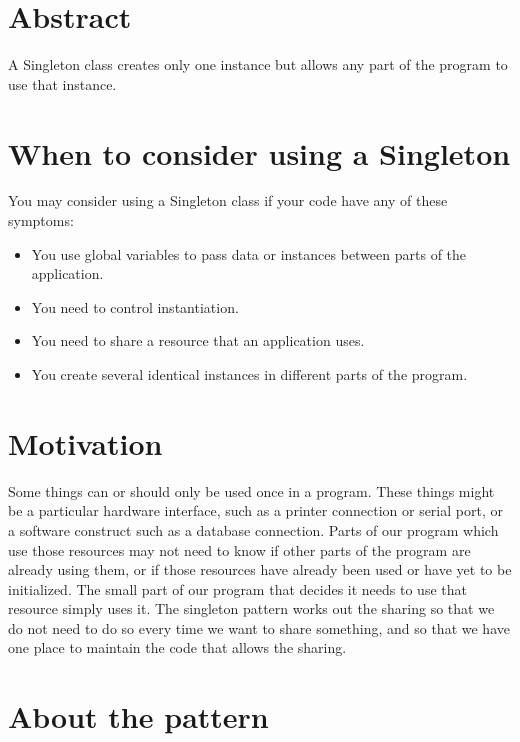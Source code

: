 
    \section{Abstract}

A Singleton class creates only one instance
but allows any part of the program to use that instance.

    \section{When to consider using a Singleton}

You may consider using a Singleton class if your code
have any of these symptoms:

\begin{itemize}
    \item You use global variables to pass data or instances
    between parts of the application.
    
    \item You need to control instantiation.
    
    \item You need to share a resource that an application uses.
    
    \item You create several identical instances in different parts of
    the program.
\end{itemize}
    
    \section{Motivation}

Some things can or should only be used once in a program.  These
things might be a particular hardware interface, such as a
printer connection or serial port, or a software construct such as a
database connection.  Parts of our program which use those
resources may not need to know if other parts of the program
are already using them, or if those resources have already
been used or have yet to be initialized.  The small part of
our program that decides it needs to use that resource simply
uses it.  The singleton pattern works out the sharing so that
we do not need to do so every time we want to share something,
and so that we have one place to maintain the code that
allows the sharing.

    \section{About the pattern}
    
